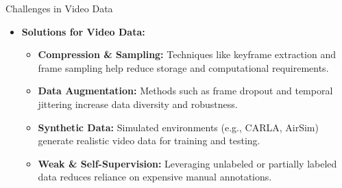 \begin{frame}[allowframebreaks]{Challenges in Video Data}
\begin{figure}
    \end{figure}
\framebreak
    \begin{itemize}
        \item \textbf{Solutions for Video Data:}
        \begin{itemize}
            \item \textbf{Compression \& Sampling:} Techniques like keyframe extraction and frame sampling help reduce storage and computational requirements.
            \item \textbf{Data Augmentation:} Methods such as frame dropout and temporal jittering increase data diversity and robustness.
            \item \textbf{Synthetic Data:} Simulated environments (e.g., CARLA, AirSim) generate realistic video data for training and testing.
            \item \textbf{Weak \& Self-Supervision:} Leveraging unlabeled or partially labeled data reduces reliance on expensive manual annotations.
        \end{itemize}
    \end{itemize}
\end{frame}
